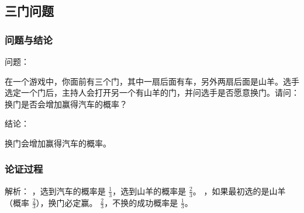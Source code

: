 \subsection{三门问题}

\subsubsection{问题与结论}

问题：

在一个游戏中，你面前有三个门，其中一扇后面有车，另外两扇后面是山羊。选手选定一个门后，主持人会打开另一个有山羊的门，并问选手是否愿意换门。请问：换门是否会增加赢得汽车的概率？

结论：

换门会增加赢得汽车的概率。

\subsubsection{论证过程}


解析：
，选到汽车的概率是 $\frac{1}{3}$，选到山羊的概率是 $\frac{2}{3}$。
，如果最初选的是山羊（概率 $\frac{2}{3}$），换门必定赢。
 $\frac{2}{3}$，不换的成功概率是 $\frac{1}{3}$。
